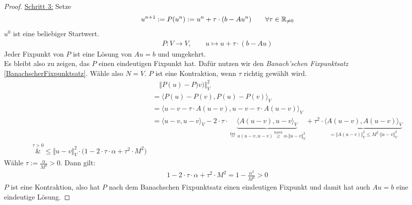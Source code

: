 \begin{proof}
	\underline{Schritt 3:} Setze
	\begin{align*}
		u^{n+1}:=P(u^n):=u^n+\tau\cdot(b-A u^n)\qquad\forall\tau\in\mathbb{R}_{\neq0}
	\end{align*}
	$u^0$ ist eine beliebiger Startwert.
	\begin{align*}
		P:V\to V,\qquad u\mapsto u+\tau\cdot(b-Au)
	\end{align*}
	Jeder Fixpunkt von $P$ ist eine Lösung von $Au=b$ und umgekehrt.\\
	Es bleibt also zu zeigen, das $P$ einen eindeutigen Fixpunkt hat. 
	Dafür nutzen wir den \textit{Banach'schen Fixpunktsatz} \ref{BanachscherFixpunktsatz}.\nl
	Wähle also $N=V$. 
	$P$ ist eine Kontraktion, wenn $\tau$ richtig gewählt wird.
	\begin{align*}
		&\quad\Vert P(u)-P)v)\Vert^2_V\\
		&=\big\langle P(u)-P(v),P(u)-P(v)\big\rangle_V\\
		&=\big\langle u-v-\tau\cdot A(u-v),u-v-\tau\cdot A(u-v)\big\rangle_V\\
		&=\langle u-v,u-v\rangle_V-2\cdot\tau\cdot\underbrace{\big\langle A(u-v),u-v\big\rangle_V}_{\stackrel{\text{Def.}}{=}a(u-v,u-v)\stackrel{\text{koerz}}{\geq}\alpha\cdot\Vert u-v\Vert^2_V}+\tau^2\cdot\underbrace{\big\langle A(u-v),A(u-v)\big\rangle_V}_{=\Vert A(u-v)\Vert^2_V\leq M^2\cdot\Vert u-v\Vert^2_V}\\
		\overset{\tau>0}&{\leq}
		\Vert u-v\Vert^2_V\cdot\big(1-2\cdot\tau\cdot\alpha+\tau^2\cdot M^2\big)
	\end{align*}
	Wähle $\tau:=\frac{\alpha}{M^2}>0$. 
	Dann gilt:
	\begin{align*}
		1-2\cdot\tau\cdot\alpha+\tau^2\cdot M^2=1-\frac{\alpha^2}{M^2}>0
	\end{align*}
	$P$ ist eine Kontraktion, also hat $P$ nach dem Banachschen Fixpunktsatz einen eindeutigen Fixpunkt und damit hat auch $Au=b$ eine eindeutige Lösung.
\end{proof}

